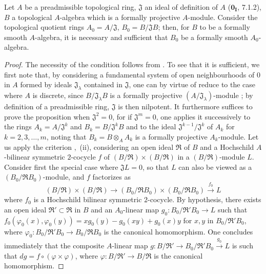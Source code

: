\begin{proposition}[19.4.7]
\label{0.19.4.7}
Let $A$ be a preadmissible topological ring, $\mathfrak{J}$ an ideal of definition of $A$ ($\mathbf{0_I}$, 7.1.2), $B$ a topological $A$-algebra which is a formally projective $A$-module.
Consider the topological quotient rings $A_0=A/\mathfrak{J}$, $B_0=B/\mathfrak{J}B$;
then, for $B$ to be a formally smooth $A$-algebra, it is necessary and sufficient that $B_0$ be a formally smooth $A_0$-algebra.
\end{proposition}

\begin{proof}
The necessity of the condition follows from .
To see that it is sufficient, we first note that, by considering a fundamental system of open neighbourhoods of $0$ in $A$ formed by ideals $\mathfrak{J}_\lambda$ contained in $\mathfrak{J}$, one can by virtue of  reduce to the case where $A$ is discrete, since $B/\mathfrak{J}_\lambda B$ is a formally projective $(A/\mathfrak{J}_\lambda)$-module ;
by definition of a preadmissible ring, $\mathfrak{J}$ is then nilpotent.
It furthermore suffices to prove the proposition when $\mathfrak{J}^2=0$, for if $\mathfrak{J}^m=0$, one applies it successively to the rings $A_k=A/\mathfrak{J}^k$ and $B_k=B/\mathfrak{J}^k B$ and to the ideal $\mathfrak{J}^{k-1}/\mathfrak{J}^k$ of $A_k$ for $k=2,3,\ldots,m$, noting  that $B_k=B\otimes_A A_k$ is a formally projective $A_k$-module.
Let us apply the criterion ,~(ii), considering an open ideal $\mathfrak{R}$ of $B$ and a Hochschild $A$-bilinear symmetric $2$-cocycle $f$ of $(B/\mathfrak{R})\times(B/\mathfrak{R})$ in a $(B/\mathfrak{R})$-module $L$.
Consider first the special case where $\mathfrak{J}L=0$, so that $L$ can also be viewed as a $(B_0/\mathfrak{R}B_0)$-module, and $f$ factorizes as
\[
  (B/\mathfrak{R})\times(B/\mathfrak{R}) \to (B_0/\mathfrak{R}B_0)\times(B_0/\mathfrak{R}B_0) \xrightarrow{f_0} L
\]
where $f_0$ is a Hochschild bilinear symmetric $2$-cocycle.
By hypothesis, there exists an open ideal $\mathfrak{R}'\subset\mathfrak{R}$ in $B$ and an $A_0$-linear map $g_0:B_0/\mathfrak{R}'B_0\to L$ such that $f_0(\varphi_0(x),\varphi_0(y))=xg_0(y)-g_0(xy)+g_0(x)y$ for $x,y$ in $B_0/\mathfrak{R}'B_0$, where $\varphi_0:B_0/\mathfrak{R}'B_0\to B_0/\mathfrak{R}B_0$ is the canonical homomorphism.
One concludes immediately that the composite $A$-linear map $g:B/\mathfrak{R}'\to B_0/\mathfrak{R}'B_0\xrightarrow{g_0}L$ is such that $dg=f\circ(\varphi\times\varphi)$, where $\varphi:B/\mathfrak{R}'\to B/\mathfrak{R}$ is the canonical homomorphism.


\end{proof}

